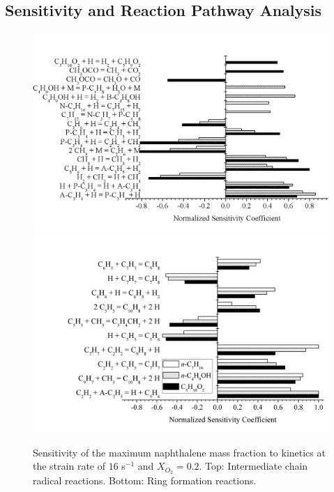 \subsection{Sensitivity and Reaction Pathway Analysis}

\begin{figure}[t]
  \centering
  \scriptsize
  \includegraphics[trim=0mm 0mm 0mm 8mm, clip=true,width=1.0\textwidth]{ch-biofuel/Chain.png}
  \includegraphics[trim=0mm 0mm 0mm 8mm, clip=true,width=1.0\textwidth]{ch-biofuel/Ring.png}
  \normalsize
  \caption{Sensitivity of the maximum naphthalene mass fraction to kinetics at the strain rate of $16$ s$^{-1}$ and $X_{O_2}=0.2$. Top: Intermediate chain radical reactions. Bottom: Ring formation reactions.}
  \label{fig:SA4}
\end{figure}

